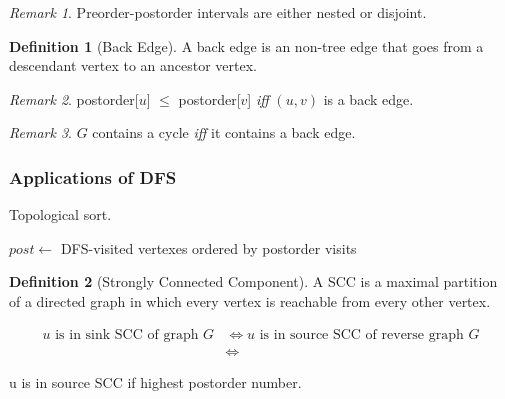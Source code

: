 \documentclass[11pt]{article}
\theoremstyle{definition}
\newtheorem{definition}{Definition}[section]
\theoremstyle{remark}
\newtheorem*{remark}{Remark}
\begin{document}
\begin{remark}
Preorder-postorder intervals are either nested or disjoint.
\end{remark}

\begin{definition}[Back Edge]
A back edge is an non-tree edge that goes from a descendant vertex to an ancestor vertex.
\end{definition}

\begin{remark}
postorder[$u$] $\leq$ postorder[$v$] \textit{iff} $(u,v)$ is a back edge.
\end{remark}

\begin{remark}
$G$ contains a cycle \textit{iff} it contains a back edge.
\end{remark}

\subsubsection{Applications of DFS}

\begin{algorithm}
    \caption{Topological sort.}
    
    \DontPrintSemicolon
    
    $post \gets$ DFS-visited vertexes ordered by postorder visits \\
\end{algorithm}

\begin{definition}[Strongly Connected Component]
A SCC is a maximal partition of a directed graph in which every vertex is reachable from every other vertex.
\end{definition}

\begin{align*}
u \mbox{ is in sink SCC of graph }G &\Leftrightarrow u \mbox{ is in source SCC of reverse graph }G \\ &\Leftrightarrow 
\end{align*}

u is in source SCC if highest postorder number.
\end{document}
